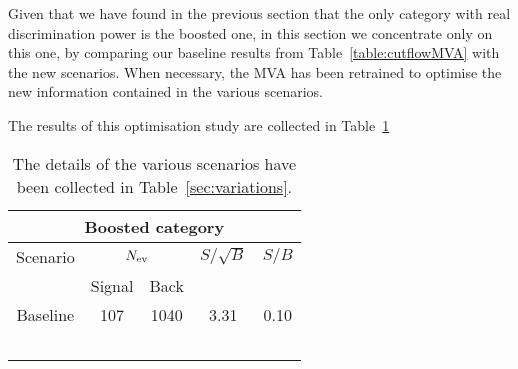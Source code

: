 Given that we have found in the previous section that the
only category with real discrimination power is the boosted one,
in this section we concentrate only on this one,
by comparing our baseline results from Table~\ref{table:cutflowMVA}
with the new scenarios.
%
When necessary, the MVA has been retrained to optimise the
new information contained in the various scenarios.

The results of this optimisation study are collected in
Table~\ref{table:cutflowMVAoptimisation}

\begin{table}[t]
  \centering
  \begin{tabular}{c||c|c|c|c}
    \hline
    \multicolumn{5}{c}{Boosted category}\\
    \hline
    \hline
 Scenario &    \multicolumn{2}{c|}{$N_{\rm ev}$} &  $S/\sqrt{B}$  & $S/B$ \\
       &   Signal & Back   &     &    \\
 \hline
 \hline
   Baseline   & 107 & 1040 & 3.31  & 0.10\\
   \hline
   &  &   &   &   \\
   &  &   &   &   \\
   &  &   &   &   \\
   &  &   &   &   \\
         &  &   &   &   \\
   \hline
  \end{tabular}
  \caption{\small The details of the various scenarios have been collected in
    Table~\ref{sec:variations}.
    \label{table:cutflowMVAoptimisation}
  }
\end{table}
